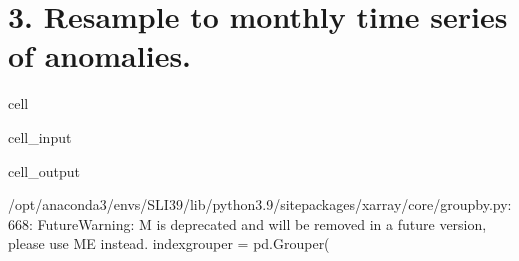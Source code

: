 \documentclass[letterpaper,10pt,english]{jupyterBook}
\begin{document}
\section{3. Resample to monthly time series of anomalies.}
\label{\detokenize{notebooks/regional_and_local/SL_anomaly_annual:resample-to-monthly-time-series-of-anomalies}}
\begin{sphinxuseclass}{cell}\begin{sphinxVerbatimInput}

\begin{sphinxuseclass}{cell_input}
\begin{sphinxVerbatim}[commandchars=\\\{\}]
  

  

    

\end{sphinxVerbatim}

\end{sphinxuseclass}\end{sphinxVerbatimInput}
\begin{sphinxVerbatimOutput}

\begin{sphinxuseclass}{cell_output}
\begin{sphinxVerbatim}[commandchars=\\\{\}]
/opt/anaconda3/envs/SLI39/lib/python3.9/site\PYGZhy{}packages/xarray/core/groupby.py:668: FutureWarning: \PYGZsq{}M\PYGZsq{} is deprecated and will be removed in a future version, please use \PYGZsq{}ME\PYGZsq{} instead.
  index\PYGZus{}grouper = pd.Grouper(
\end{sphinxVerbatim}


\end{sphinxuseclass}
\end{sphinxVerbatimOutput}
\end{sphinxuseclass}
\end{document}
